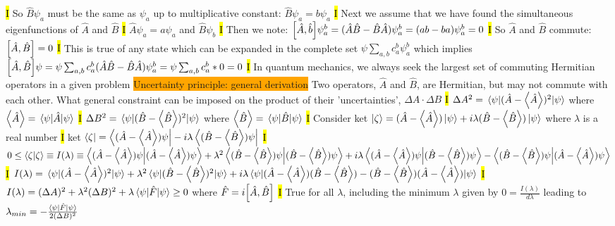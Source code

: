 \documentclass[fontsize=4pt]{scrartcl}
\begin{document}
\hl{I}
So $\hat{B}\psi_a$ must be the same as $\psi_a$ up to multiplicative constant: $\hat{B}\psi_a = b \psi_a$
\hl{I}
Next we assume that we have found the simultaneous eigenfunctions of $\hat{A}$ and $\hat{B}$ 
\hl{I}
$\hat{A}\psi_a = a\psi_a$ and $\hat{B}\psi_b$
\hl{I}
Then we note: $\comm{\hat{A}}{\hat{b}}\psi_{a}^{b} = (\hat{A}\hat{B} - \hat{B}\hat{A})\psi_{a}^{b} = (ab-ba)\psi_{a}^{b} = 0$
\hl{I}
So $\hat{A}$ and $\hat{B}$ commute: $\comm{\hat{A}}{\hat{B}}  = 0$
\hl{I}
This is true of any state which can be expanded in the complete set $\psi \sum_{a,b}c_a^b \psi_a^b$ which implies $\comm{\hat{A}}{\hat{B}}\psi = \psi \sum_{a,b}c_a^b (\hat{A}\hat{B} - \hat{B}\hat{A})\psi_a^b = \psi \sum_{a,b}c_a^b * 0  =0$
\hl{I}
In quantum mechanics, we always seek the largest set of commuting Hermitian operators in a given problem 
\colorbox{Orange}{Uncertainty principle: general derivation}
Two operators, $\hat{A}$ and $\hat{B}$, are Hermitian, but may not commute with each other. What general constraint can be imposed on the product of their 'uncertainties', $\Delta A \cdot \Delta B $
\hl{I}
$\Delta A^2 = \expval{(\hat{A}- \expval{\hat{A}})^2 }{\psi }$ where $ \expval{\hat{A}} = \expval{\hat{A}}{\psi}$
\hl{I}
$\Delta B^2 = \expval{(\hat{B}- \expval{\hat{B}})^2 }{\psi }$ where $ \expval{\hat{B}} = \expval{\hat{B}}{\psi}$
\hl{I}
Consider ket $\ket{\zeta} = (\hat{A} - \expval{\hat{A}}) \ket{\psi} + i\lambda (\hat{B} - \expval{\hat{B}}) \ket{\psi}$ where $\lambda$ is a real number
\hl{I}
 ket $\bra{\zeta} = \bra{(\hat{A} - \expval{\hat{A}})\psi}  - i\lambda \bra{(\hat{B} - \expval{\hat{B}}) \psi}$
 \hl{I}
 $0 \leq \braket{\zeta}{\zeta} \equiv I(\lambda) \equiv \braket{(\hat{A} - \expval{\hat{A}})\psi}{(\hat{A} - \expval{\hat{A}})\psi} + \lambda^2 \braket{(\hat{B} - \expval{\hat{B}}) \psi}{(\hat{B} - \expval{\hat{B}}) \psi} + i\lambda \braket{(\hat{A} - \expval{\hat{A}})\psi}{(\hat{B} - \expval{\hat{B}}) \psi} - \braket{(\hat{B} - \expval{\hat{B}}) \psi}{(\hat{A} - \expval{\hat{A}})\psi} $
 \hl{I}
 $I(\lambda) = \expval{(\hat{A} - \expval{\hat{A}})^2}{\psi} + \lambda^2 \expval{(\hat{B} - \expval{\hat{B}})^2}{\psi} + i\lambda \expval{(\hat{A} - \expval{\hat{A}})(\hat{B} - \expval{\hat{B}}) - (\hat{B} - \expval{\hat{B}})(\hat{A} - \expval{\hat{A}})}{\psi}$ 
 \hl{I}
 $I(\lambda) = (\Delta A)^2 + \lambda^2 (\Delta B)^2 + \lambda \expval{\hat{F}}{\psi} \geq  0$ where $\hat{F} = i\comm{\hat{A}}{\hat{B}}$
 \hl{I}
 True for all $\lambda$, including the minimum $\lambda$ given by $0 = \frac{I(\lambda)}{d\lambda}$ leading to $\lambda_{min} = - \frac{\expval{\hat{F}}{\psi}}{2(\Delta B)^2}$
\end{document}
